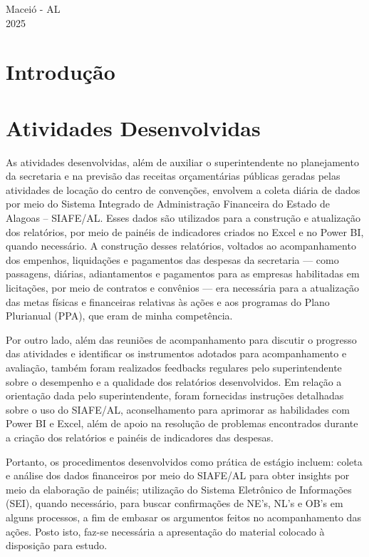\documentclass[12pt,a4paper]{article}
\begin{document}
	\vfill
	\begin{flushright}
		\centering Maceió - AL \\
		2025
	\end{flushright}
	
	\newpage
	
	\section{Introdução}
	
	\hspace*{1,5cm}
	
	\section{Atividades Desenvolvidas}
	

	\hspace*{1,5cm} As atividades desenvolvidas, além de auxiliar o superintendente no planejamento da secretaria e na previsão das 
 receitas orçamentárias públicas geradas pelas atividades de locação do centro de convenções, envolvem a coleta diária de dados por meio do Sistema
 Integrado de Administração Financeira do Estado de Alagoas – SIAFE/AL. Esses dados são utilizados para a construção e atualização dos relatórios, 
 por meio de painéis de indicadores criados no Excel e no Power BI, quando necessário. A construção desses relatórios, voltados ao acompanhamento dos empenhos, 
 liquidações e pagamentos das despesas da secretaria — como passagens, diárias, adiantamentos e pagamentos para as empresas habilitadas em licitações, 
 por meio de contratos e convênios — era necessária para a atualização das metas físicas e financeiras relativas às ações e aos programas do Plano Plurianual (PPA),
 que eram de minha competência.  

	Por outro lado, além das reuniões de acompanhamento para discutir o progresso das atividades e identificar os instrumentos 
 adotados para acompanhamento e avaliação, também foram realizados feedbacks regulares pelo superintendente sobre o desempenho e a 
 qualidade dos relatórios desenvolvidos. Em relação a orientação dada pelo superintendente, foram fornecidas instruções detalhadas sobre o uso do SIAFE/AL, 
 aconselhamento para aprimorar as habilidades com Power BI e Excel, além de apoio na resolução de problemas encontrados durante a criação dos relatórios e painéis 
 de indicadores das despesas.  
	
	Portanto, os procedimentos desenvolvidos como prática de estágio incluem: coleta e análise dos dados financeiros por meio do SIAFE/AL 
 para obter insights por meio da elaboração de painéis; utilização do Sistema Eletrônico de Informações (SEI), quando necessário, 
 para buscar confirmações de NE’s, NL’s e OB’s em alguns processos, a fim de embasar os argumentos feitos no acompanhamento das ações.
 Posto isto, faz-se necessária a apresentação do material colocado à disposição para estudo.
\end{document}
